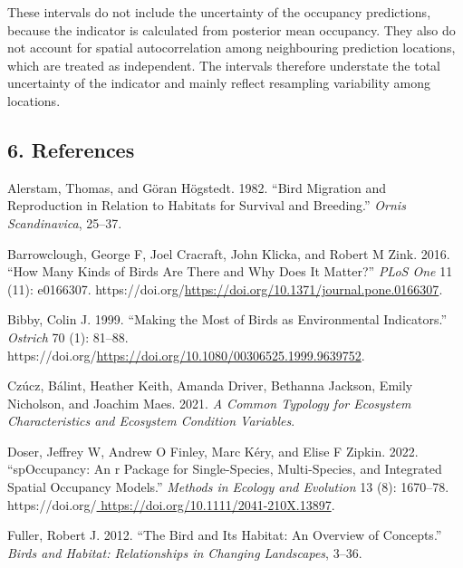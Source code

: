 \documentclass[
  letterpaper,
  DIV=11,
  numbers=noendperiod]{scrartcl}
\newlength{\cslhangindent}
\newenvironment{CSLReferences}[2] %
 {\begin{list}{}{%
  \setlength{\itemindent}{0pt}
  \setlength{\leftmargin}{0pt}
  \setlength{\parsep}{0pt}
  \ifodd #1
   \setlength{\leftmargin}{\cslhangindent}
   \setlength{\itemindent}{-1\cslhangindent}
  \fi
  \setlength{\itemsep}{#2\baselineskip}}}
 {\end{list}}
\begin{document}
These intervals do not include the uncertainty of the occupancy
predictions, because the indicator is calculated from posterior mean
occupancy. They also do not account for spatial autocorrelation among
neighbouring prediction locations, which are treated as independent. The
intervals therefore understate the total uncertainty of the indicator
and mainly reflect resampling variability among locations.

\subsection{6. References}\label{references}

\protect{}\label{refs}
\begin{CSLReferences}{1}{1}
Alerstam, Thomas, and Göran Högstedt. 1982. {``Bird Migration and
Reproduction in Relation to Habitats for Survival and Breeding.''}
\emph{Ornis Scandinavica}, 25--37.

Barrowclough, George F, Joel Cracraft, John Klicka, and Robert M Zink.
2016. {``How Many Kinds of Birds Are There and Why Does It Matter?''}
\emph{PLoS One} 11 (11): e0166307.
https://doi.org/\url{https://doi.org/10.1371/journal.pone.0166307}.

Bibby, Colin J. 1999. {``Making the Most of Birds as Environmental
Indicators.''} \emph{Ostrich} 70 (1): 81--88.
https://doi.org/\url{https://doi.org/10.1080/00306525.1999.9639752}.

Czúcz, Bálint, Heather Keith, Amanda Driver, Bethanna Jackson, Emily
Nicholson, and Joachim Maes. 2021. \emph{A Common Typology for Ecosystem
Characteristics and Ecosystem Condition Variables}.

Doser, Jeffrey W, Andrew O Finley, Marc Kéry, and Elise F Zipkin. 2022.
{``spOccupancy: An r Package for Single-Species, Multi-Species, and
Integrated Spatial Occupancy Models.''} \emph{Methods in Ecology and
Evolution} 13 (8): 1670--78.
https://doi.org/\href{\%20https://doi.org/10.1111/2041-210X.13897}{
https://doi.org/10.1111/2041-210X.13897}.

Fuller, Robert J. 2012. {``The Bird and Its Habitat: An Overview of
Concepts.''} \emph{Birds and Habitat: Relationships in Changing
Landscapes}, 3--36.


\end{CSLReferences}
\end{document}
